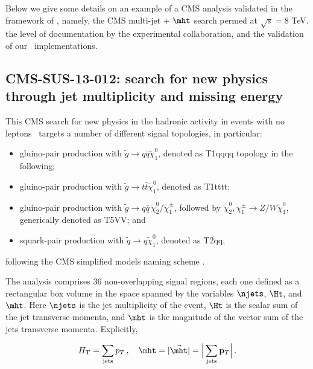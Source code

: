 Below we give some details on an example of a CMS analysis validated in the framework of \ma, namely, the CMS multi-jet $+$ $\mht$ search permed at $\sqrt{s}=8$ TeV. the level of documentation by the experimental collaboration, 
and the validation of our \ma\ implementations. 


\subsection{CMS-SUS-13-012: search for new physics through jet multiplicity and missing energy} 
\label{sec:cms-sus-13-012}

This CMS search for new physics in the hadronic activity in events with no leptons~\cite{Chatrchyan:2014lfa} targets a number of different signal topologies, in particular:
\begin{itemize}
\item gluino-pair production with $\tilde g\to q\bar q\tilde\chi^0_1$, denoted as T1qqqq topology in the following;
\item gluino-pair production with $\tilde g\to t\bar t\tilde\chi^0_1$, denoted as T1tttt; 
\item gluino-pair production with $\tilde g\to q\bar q\,\tilde\chi^0_2/\tilde\chi^\pm_1$, followed by 
$\tilde\chi^0_2,\chi^\pm_1 \to Z/W\tilde\chi^0_1$, generically denoted as T5VV; and 
\item squark-pair production with $\tilde q\to q\tilde\chi^0_1$, denoted as T2qq, 
\end{itemize}
following the CMS simplified models naming scheme \cite{Chatrchyan:2013sza}. 


The analysis comprises 36 non-overlapping signal regions, each one defined as
a rectangular box volume in the space spanned by the variables $\njets$, $\Ht$, and $\mht$. Here $\njets$ is the jet multiplicity of the event, $\Ht$ is the scalar sum of the jet transverse momenta, and $\mht$ is the magnitude of the vector sum of the jets transverse momenta. Explicitly, 

\begin{equation}
  H_{\rm T} = \sum_{\rm jets}{p_T}\,,\quad  \mht =  |\vec{\mht}| = \Big| \sum_{\rm jets}{{\bf p}_T} \Big|\,.
\label{eq:HTdefs}
\end{equation}

